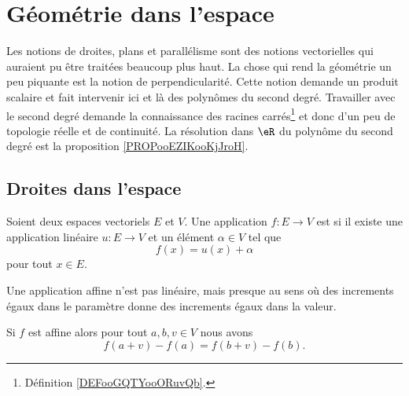 

\section{Géométrie dans l'espace}

\begin{normaltext}
	Les notions de droites, plans et parallélisme sont des notions vectorielles qui auraient pu être traitées beaucoup plus haut. La chose qui rend la géométrie un peu piquante est la notion de perpendicularité. Cette notion demande un produit scalaire et fait intervenir ici et là des polynômes du second degré. Travailler avec le second degré demande la connaissance des racines carrés\footnote{Définition \ref{DEFooGQTYooORuvQb}.} et donc d'un peu de topologie réelle et de continuité. La résolution dans \( \eR\) du polynôme du second degré est la proposition \ref{PROPooEZIKooKjJroH}.
\end{normaltext}

\subsection{Droites dans l'espace}

\begin{definition}      \label{DEFooVTXWooVXfUnc}
	Soient deux espaces vectoriels \( E\) et \( V\). Une application \( f\colon E\to V\) est  si il existe une application linéaire \( u\colon E \to V\) et un élément \( \alpha\in V\) tel que
	\begin{equation}
		f(x)=u(x)+\alpha
	\end{equation}
	pour tout \( x\in E\).
\end{definition}

Une application affine n'est pas linéaire, mais presque au sens où des increments égaux dans le paramètre donne des increments égaux dans la valeur.
\begin{lemma}       \label{LEMooEQEAooQaFCMW}
    Si \( f\) est affine alors pour tout \( a,b,v\in V\) nous avons
    \begin{equation}
        f(a+v)-f(a)=f(b+v)-f(b).
    \end{equation}
\end{lemma}

